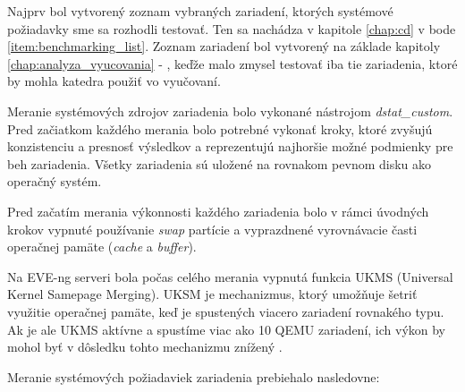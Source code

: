 Najprv bol vytvorený zoznam vybraných zariadení, ktorých systémové požiadavky sme sa rozhodli testovať. Ten sa nachádza v kapitole \ref{chap:cd} v bode \ref{item:benchmarking_list}. Zoznam zariadení bol vytvorený na základe kapitoly \ref{chap:analyza_vyucovania} - , keďže malo zmysel testovať iba tie zariadenia, ktoré by mohla katedra použiť vo vyučovaní.

Meranie systémových zdrojov zariadenia bolo vykonané nástrojom \emph{dstat\_custom}. Pred začiatkom každého merania bolo potrebné vykonať kroky, ktoré zvyšujú konzistenciu a presnosť výsledkov a reprezentujú najhoršie možné podmienky pre beh zariadenia. Všetky zariadenia sú uložené na rovnakom pevnom disku ako operačný systém.

Pred začatím merania výkonnosti každého zariadenia bolo v rámci úvodných krokov vypnuté používanie \emph{swap} partície a vyprazdnené vyrovnávacie časti operačnej pamäte (\emph{cache} a \emph{buffer}).

Na EVE-ng serveri bola počas celého merania vypnutá funkcia UKMS (Universal Kernel Samepage Merging). UKSM je mechanizmus, ktorý umožňuje šetriť využitie operačnej pamäte, keď je spustených viacero zariadení rovnakého typu. Ak je ale UKMS aktívne a spustíme viac ako 10 QEMU zariadení, ich výkon by mohol byť v dôsledku tohto mechanizmu znížený \cite{eve_ng_faq}.

\noindent
Meranie systémových požiadaviek zariadenia prebiehalo nasledovne:

